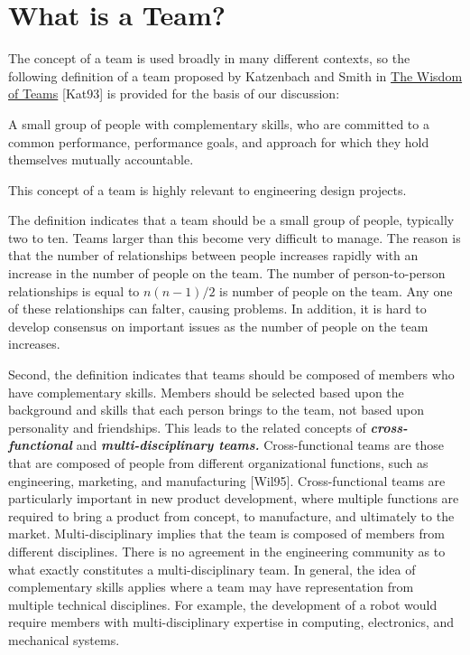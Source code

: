 \section{What is a Team?}
\label{section:what-is-a-team}

The concept of a team is used broadly in many different contexts, so the
following definition of a team proposed by Katzenbach and Smith in
\ul{The Wisdom of Teams} {[}Kat93{]} is provided for the basis of our
discussion:

\begin{itquote}
A small group of people with complementary skills, who are committed to
a common performance, performance goals, and approach for which they
hold themselves mutually accountable.
\end{itquote}

This concept of a team is highly relevant to engineering design
projects.

The definition indicates that a team should be a small group of people,
typically two to ten. Teams larger than this become very difficult to
manage. The reason is that the number of relationships between people
increases rapidly with an increase in the number of people on the team.
The number of person-to-person relationships is equal to
$n(n-1)/2$ is number of people on the team. Any one
of these relationships can falter, causing problems. In addition, it is
hard to develop consensus on important issues as the number of people on
the team increases.

Second, the definition indicates that teams should be composed of
members who have complementary skills. Members should be selected based
upon the background and skills that each person brings to the team, not
based upon personality and friendships. This leads to the related
concepts of \emph{\textbf{cross-functional}} and
\emph{\textbf{multi-disciplinary teams.}} Cross-functional teams are
those that are composed of people from different organizational
functions, such as engineering, marketing, and manufacturing
{[}Wil95{]}. Cross-functional teams are particularly important in new
product development, where multiple functions are required to bring a
product from concept, to manufacture, and ultimately to the market.
Multi-disciplinary implies that the team is composed of members from
different disciplines. There is no agreement in the engineering
community as to what exactly constitutes a multi-disciplinary team. In
general, the idea of complementary skills applies where a team may have
representation from multiple technical disciplines. For example, the
development of a robot would require members with multi-disciplinary
expertise in computing, electronics, and mechanical systems.

